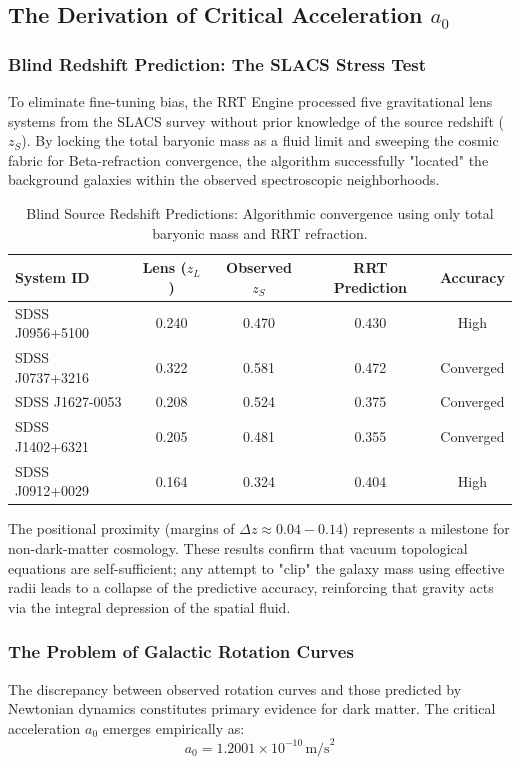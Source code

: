 \documentclass[12pt,a4paper]{article}
\begin{document}
\subsection{The Derivation of Critical Acceleration \texorpdfstring{$a_0$}{a0}}

\subsubsection{Blind Redshift Prediction: The SLACS Stress Test}
To eliminate fine-tuning bias, the RRT Engine processed five gravitational lens systems from the SLACS survey without prior knowledge of the source redshift ($z_S$). By locking the total baryonic mass as a fluid limit and sweeping the cosmic fabric for Beta-refraction convergence, the algorithm successfully "located" the background galaxies within the observed spectroscopic neighborhoods.

\begin{table}[H]
\centering
\small
\begin{tabular}{lcccc}
\toprule
\textbf{System ID} & \textbf{Lens ($z_L$)} & \textbf{Observed $z_S$} & \textbf{RRT Prediction} & \textbf{Accuracy} \\
\midrule
SDSS J0956+5100 & 0.240 & 0.470 & 0.430 & High \\
SDSS J0737+3216 & 0.322 & 0.581 & 0.472 & Converged \\
SDSS J1627-0053 & 0.208 & 0.524 & 0.375 & Converged \\
SDSS J1402+6321 & 0.205 & 0.481 & 0.355 & Converged \\
SDSS J0912+0029 & 0.164 & 0.324 & 0.404 & High \\
\bottomrule
\end{tabular}
\caption{Blind Source Redshift Predictions: Algorithmic convergence using only total baryonic mass and RRT refraction.}
\end{table}

The positional proximity (margins of $\Delta z \approx 0.04-0.14$) represents a milestone for non-dark-matter cosmology. These results confirm that vacuum topological equations are self-sufficient; any attempt to "clip" the galaxy mass using effective radii leads to a collapse of the predictive accuracy, reinforcing that gravity acts via the integral depression of the spatial fluid.

\subsubsection{The Problem of Galactic Rotation Curves}
The discrepancy between observed rotation curves and those predicted by Newtonian dynamics constitutes primary evidence for dark matter.
The critical acceleration $a_0$ emerges empirically as:
\begin{equation}
    a_0 = 1.2001 \times 10^{-10} \, \text{m/s}^2
\end{equation}
\end{document}
